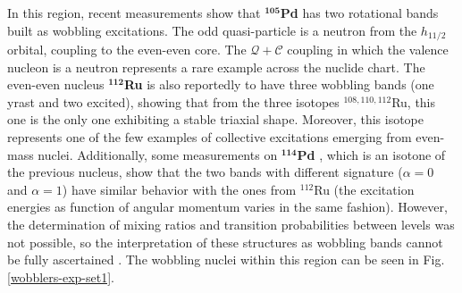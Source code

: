 In this region, recent measurements show that $^\mathbf{105}$\textbf{Pd} \cite{timar2019experimental} has two rotational bands built as wobbling excitations. The odd quasi-particle is a neutron from the $h_{11/2}$ orbital, coupling to the even-even core. The $\mathcal{Q}+\mathscr{C}$ coupling in which the valence nucleon is a neutron represents a rare example across the nuclide chart. The even-even nucleus $^\mathbf{112}$\textbf{Ru} \cite{hamilton2010super} is also reportedly to have three wobbling bands (one yrast and two excited), showing that from the three isotopes $^{108,110,112}$Ru, this one is the only one exhibiting a stable triaxial shape. Moreover, this isotope represents one of the few examples of collective excitations emerging from even-mass nuclei. Additionally, some measurements on $^\mathbf{114}$\textbf{Pd} \cite{luo2013triaxial}, which is an isotone of the previous nucleus, show that the two bands with different signature ($\alpha=0$ and $\alpha=1$) have similar behavior with the ones from $^{112}$Ru (the excitation energies as function of angular momentum varies in the same fashion). However, the determination of mixing ratios and transition probabilities between levels was not possible, so the interpretation of these structures as wobbling bands cannot be fully ascertained \cite{lv2022experimental}. The wobbling nuclei within this region can be seen in Fig. \ref{wobblers-exp-set1}.
